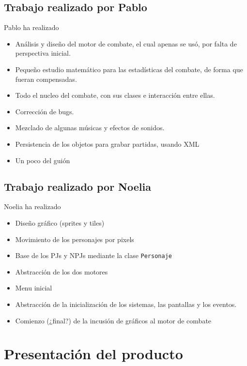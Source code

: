 \documentclass[9pt,xcolor=svgnames]{beamer}
\begin{document}
\subsection{Trabajo realizado por Pablo}
\begin{frame}{Pablo ha realizado}
  \transdissolve

  \begin{itemize}
  \item Análisis y diseño del motor de combate, el cual apenas se usó, por falta
    de perspectiva inicial.
  \item Pequeño estudio matemático para las estadísticas del combate, de
    forma que fueran compensadas.
  \item Todo el nucleo del combate, con sus clases e interacción entre ellas.
  \item Corrección de bugs.
  \item Mezclado de algunas músicas y efectos de sonidos.
  \item Persistencia de los objetos para grabar partidas, usando XML
  \item Un poco del guión
  \end{itemize}
\end{frame}

\subsection{Trabajo realizado por Noelia}
\begin{frame}{Noelia ha realizado}
  \transdissolve

  \begin{itemize}
  \item Diseño gráfico (sprites y tiles)
  \item Movimiento de los personajes por pixels
  \item Base de los PJs y NPJs mediante la clase \texttt{Personaje}
  \item Abstracción de los dos motores
  \item Menu inicial
  \item Abstracción de la inicialización de los sistemas, las pantallas y 
    los eventos.
  \item Comienzo (¿final?) de la incusión de gráficos al motor de combate
  \end{itemize}
\end{frame}

\section{Presentación del producto}
\end{document}
